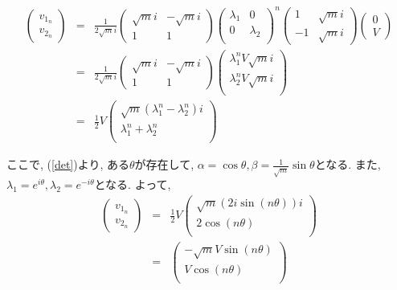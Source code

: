 \documentclass[lualatex,a5paper,ja=standard]{bxjsarticle}
\begin{document}
\begin{eqnarray}
    \begin{pmatrix}
        v_{1_n}\\
        v_{2_n}
    \end{pmatrix}
        &=&
        \frac{1}{2\sqrt{m}i}\begin{pmatrix}
            \sqrt{m}i & -\sqrt{m}i\\
            1 & 1
        \end{pmatrix}\begin{pmatrix}
            \lambda_1 & 0 \\
            0 & \lambda_2 \\
        \end{pmatrix}^n\begin{pmatrix}
            1 & \sqrt{m}i\\
            -1 & \sqrt{m}i
        \end{pmatrix}\begin{pmatrix}
            0\\
            V
        \end{pmatrix}\\
        &=&
        \frac{1}{2\sqrt{m}i}\begin{pmatrix}
            \sqrt{m}i & -\sqrt{m}i\\
            1 & 1
        \end{pmatrix}\begin{pmatrix}
            \lambda_1^n V\sqrt{m}i \\
            \lambda_2^n V\sqrt{m}i \\
        \end{pmatrix}\\
        &=&
        \frac{1}{2}V\begin{pmatrix}
            \sqrt{m}(\lambda_1^n-\lambda_2^n)i \\
            \lambda_1^n+\lambda_2^n \\
        \end{pmatrix}
\end{eqnarray}

ここで, (\ref{det})より, ある$\theta$が存在して, $\alpha = \cos \theta, \beta = \frac{1}{\sqrt{m}} \sin \theta$となる.
また, $\lambda_1 = e^{i\theta}, \lambda_2 = e^{-i\theta}$となる. よって, 
\begin{eqnarray}
    \begin{pmatrix}
        v_{1_n}\\
        v_{2_n}
    \end{pmatrix}
    &=&
    \frac{1}{2}V\begin{pmatrix}
        \sqrt{m}(2i\sin(n\theta))i \\
        2\cos(n\theta) \\
    \end{pmatrix}\\
        &=&
        \begin{pmatrix}
            -\sqrt{m}V\sin(n\theta) \\
            V\cos(n\theta) \\
        \end{pmatrix} \label{res1}
\end{eqnarray}
\end{document}
